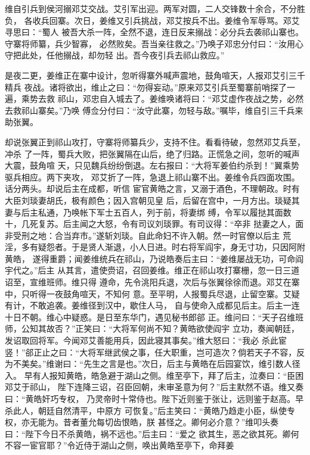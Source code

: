 维自引兵到侯河搦邓艾交战。艾引军出迎。两军对圆，二人交锋数十余合，不分胜负，
各收兵回寨。次日，姜维又引兵挑战，邓艾按兵不出。姜维令军辱骂。邓艾寻思曰：“蜀人
被吾大杀一阵，全然不退，连日反来搦战：必分兵去袭祁山寨也。守寨将师纂，兵少智寡，
必然败矣。吾当亲往救之。”乃唤子邓忠分付曰：“汝用心守把此处，任他搦战，却勿轻
出。吾今夜引兵去祁山救应。”

是夜二更，姜维正在寨中设计，忽听得寨外喊声震地，鼓角喧天，人报邓艾引三千精兵
夜战。诸将欲出，维止之曰：“勿得妄动。”原来邓艾引兵至蜀寨前哨探了一遍，乘势去救
祁山，邓忠自入城去了。姜维唤诸将曰：“邓艾虚作夜战之势，必然去救祁山寨矣。”乃唤
傅佥分付曰：“汝守此寨，勿轻与敌。”嘱毕，维自引三千兵来助张翼。

却说张翼正到祁山攻打，守寨将师纂兵少，支持不住。看看待破，忽然邓艾兵至，冲杀
了一阵，蜀兵大败，把张翼隔在山后，绝了归路。正慌急之间，忽听的喊声大震，鼓角喧
天，只见魏兵纷纷倒退。左右报曰：“大将军姜伯约杀到！”翼乘势驱兵相应。两下夹攻，
邓艾折了一阵，急退上祁山寨不出。姜维令兵四面攻围。话分两头。却说后主在成都，听信
宦官黄皓之言，又溺于酒色，不理朝政。时有大臣刘琰妻胡氏，极有颜色；因入宫朝见皇
后，后留在宫中，一月方出。琰疑其妻与后主私通，乃唤帐下军士五百人，列于前，将妻绑
缚，令军以履挞其面数十，几死复苏。后主闻之大怒，令有司议刘琰罪。有司议得：“卒非
挞妻之人，面非受刑之地：合当弃市。”遂斩刘琰。自此命妇不许入朝。然一时官僚以后主
荒淫，多有疑怨者。于是贤人渐退，小人日进。时右将军阎宇，身无寸功，只因阿附黄皓，
遂得重爵；闻姜维统兵在祁山，乃说皓奏后主曰：“姜维屡战无功，可命阎宇代之。”后主
从其言，遣使赍诏，召回姜维。维正在祁山攻打寨栅，忽一日三道诏至，宣维班师。维只得
遵命，先令洮阳兵退，次后与张翼徐徐而退。邓艾在寨中，只听得一夜鼓角喧天，不知何
意。至平明，人报蜀兵尽退，止留空寨。艾疑有计，不敢追袭。姜维径到汉中，歇住人马，
自与使命入成都见后主。后主一连十日不朝。维心中疑惑。是日至东华门，遇见秘书郎郤
正。维问曰：“天子召维班师，公知其故否？”正笑曰：“大将军何尚不知？黄皓欲使阎宇
立功，奏闻朝廷，发诏取回将军。今闻邓艾善能用兵，因此寝其事矣。”维大怒曰：“我必
杀此宦竖！”郤正止之曰：“大将军继武侯之事，任大职重，岂可造次？倘若天子不容，反
为不美矣。”维谢曰：“先生之言是也。”次日，后主与黄皓在后园宴饮，维引数人径入。
早有人报知黄皓，皓急避于湖山之侧。维至亭下，拜了后主，泣奏曰：“臣困邓艾于祁山，
陛下连降三诏，召臣回朝，未审圣意为何？”后主默然不语。维又奏曰：“黄皓奸巧专权，
乃灵帝时十常侍也。陛下近则鉴于张让，远则鉴于赵高。早杀此人，朝廷自然清平，中原方
可恢复。”后主笑曰：“黄皓乃趋走小臣，纵使专权，亦无能为。昔者董允每切齿恨皓，朕
甚怪之。卿何必介意？”维叩头奏曰：“陛下今日不杀黄皓，祸不远也。”后主曰：“爱之
欲其生，恶之欲其死。卿何不容一宦官耶？”令近侍于湖山之侧，唤出黄皓至亭下，命拜姜
